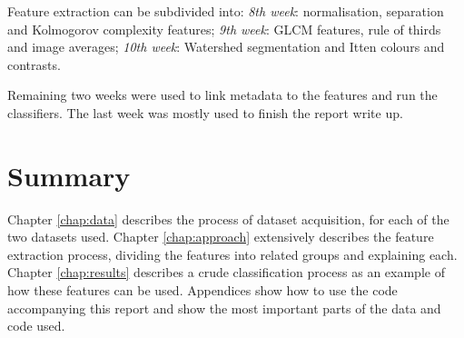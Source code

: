 \documentclass[11pt,a4paper,twoside,openright,draft]{report}
\begin{document}
\begin{multicols}{2}
Feature extraction can be subdivided into: \emph{8th week}: normalisation,
separation and Kolmogorov complexity features;  \emph{9th week}: GLCM features,
rule of thirds and image averages; \emph{10th week}: Watershed segmentation and
Itten colours and contrasts.

Remaining two weeks were used to link metadata to the features and run the
classifiers.  The last week was mostly used to finish the report write up.

\section{Summary}

Chapter \ref{chap:data} describes the process of dataset acquisition, for each
of the two datasets used.  Chapter \ref{chap:approach} extensively describes
the feature extraction process, dividing the features into related groups and
explaining each.  Chapter \ref{chap:results} describes a crude classification
process as an example of how these features can be used.  Appendices show how
to use the code accompanying this report and show the most important parts of
the data and code used.

\end{multicols}
\end{document}
